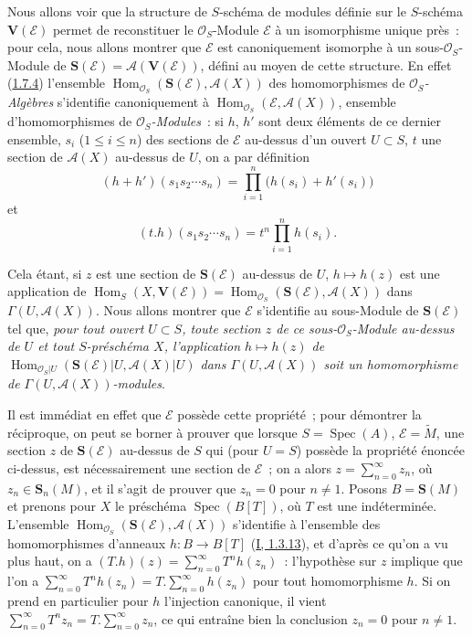 \begin{env}[1.7.14]
\label{II.1.7.14-fr}
Nous allons voir que la structure de $S$-schéma de modules définie sur le
$S$-schéma $\mathbf{V}(\mathcal{E})$ permet de reconstituer le
$\mathcal{O}_S$-Module $\mathcal{E}$ à un isomorphisme unique près~: pour
cela, nous allons montrer que $\mathcal{E}$ est canoniquement isomorphe à un
sous-$\mathcal{O}_S$-Module de
$\mathbf{S}(\mathcal{E})=\mathcal{A}(\mathbf{V}(\mathcal{E}))$, défini au
moyen de cette structure. En effet
(\hyperref[II.1.7.4-fr]{1.7.4}) l'ensemble
$\operatorname{Hom}_{\mathcal{O}_S}(\mathbf{S}(\mathcal{E}),
\mathcal{A}(X))$ des homomorphismes de
\emph{$\mathcal{O}_S$-Algèbres} s'identifie canoniquement à
$\operatorname{Hom}_{\mathcal{O}_S}(\mathcal{E},\mathcal{A}(X))$, ensemble
d'homomorphismes de \emph{$\mathcal{O}_S$-Modules}~: si $h$, $h'$ sont deux
éléments de ce dernier ensemble, $s_i$ ($1\leq i\leq n$) des sections de
$\mathcal{E}$ au-dessus d'un ouvert $U\subset S$, $t$ une section de
$\mathcal{A}(X)$ au-dessus de $U$, on a par définition
\[
  (h+h')(s_1s_2\cdots s_n)
  =\prod_{i=1}^n\bigl(h(s_i)+h'(s_i)\bigr)
\]
et
\[
  (t.h)(s_1s_2\cdots s_n)=t^n\prod_{i=1}^n h(s_i).
\]

Cela étant, si $z$ est une section de $\mathbf{S}(\mathcal{E})$ au-dessus
de $U$, $h\mapsto h(z)$ est une application de
$\operatorname{Hom}_S(X,\mathbf{V}(\mathcal{E}))
=\operatorname{Hom}_{\mathcal{O}_S}(\mathbf{S}(\mathcal{E}),
\mathcal{A}(X))$ dans $\Gamma(U,\mathcal{A}(X))$. Nous allons
montrer que $\mathcal{E}$ s'identifie au sous-Module de
$\mathbf{S}(\mathcal{E})$ tel que, \emph{pour tout ouvert $U\subset S$,
toute section $z$ de ce sous-$\mathcal{O}_S$-Module au-dessus de $U$ et tout
$S$-préschéma $X$, l'application $h\mapsto h(z)$ de
$\operatorname{Hom}_{\mathcal{O}_S|U}(\mathbf{S}(\mathcal{E})|U,
\mathcal{A}(X)|U)$ dans $\Gamma(U,\mathcal{A}(X))$ soit un homomorphisme de
$\Gamma(U,\mathcal{A}(X))$-modules}.

Il est immédiat en effet que $\mathcal{E}$ possède cette propriété~; pour
démontrer la réciproque, on peut se borner à prouver que lorsque
$S=\operatorname{Spec}(A)$, $\mathcal{E}=\widetilde{M}$, une section $z$ de
$\mathbf{S}(\mathcal{E})$ au-dessus de $S$ qui (pour $U=S$) possède la
propriété énoncée ci-dessus, est nécessairement une section de
$\mathcal{E}$~; on a alors $z=\sum_{n=0}^{\infty}z_n$, où
$z_n\in\mathbf{S}_n(M)$, et il s'agit de prouver que $z_n=0$ pour $n\ne1$.
Posons $B=\mathbf{S}(M)$ et prenons pour $X$ le préschéma
$\operatorname{Spec}(B[T])$, où $T$ est une indéterminée. L'ensemble
$\operatorname{Hom}_{\mathcal{O}_S}(\mathbf{S}(\mathcal{E}),
\mathcal{A}(X))$ s'identifie à l'ensemble des homomorphismes d'anneaux
$h:B\to B[T]$ (\hyperref[I.1.3.13-fr]{I, 1.3.13}), et d'après ce qu'on a vu
plus haut, on a
$(T.h)(z)=\sum_{n=0}^{\infty}T^nh(z_n)$~: l'hypothèse sur $z$ implique que
l'on a
$\sum_{n=0}^{\infty}T^nh(z_n)=T.\sum_{n=0}^{\infty}h(z_n)$ pour tout
homomorphisme $h$. Si on prend en particulier pour $h$ l'injection
canonique, il vient
$\sum_{n=0}^{\infty}T^nz_n=T.\sum_{n=0}^{\infty}z_n$, ce qui entraîne bien
la conclusion $z_n=0$ pour $n\ne1$.
\end{env}

